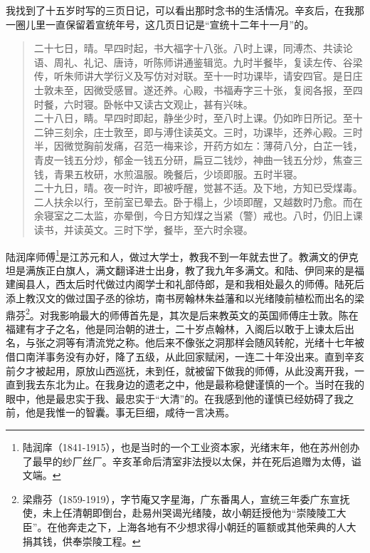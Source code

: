 我找到了十五岁时写的三页日记，可以看出那时念书的生活情况。辛亥后，在我那一圈儿里一直保留着宣统年号，这几页日记是“宣统十二年十一月”的。\\

\begin{quote}
	二十七日，晴。早四时起，书大福字十八张。八时上课，同溥杰、共读论语、周礼、礼记、唐诗，听陈师讲通鉴辑览。九时半餐毕，复读左传、谷梁传，听朱师讲大学衍义及写仿对对联。至十一时功课毕，请安四官。是日庄士敦未至，因微受感冒。遂还养。心殿，书福寿字三十张，复阅各报，至四时餐，六时寝。卧帐中又读古文观止，甚有兴味。\\

二十八日，睛。早四时即起，静坐少时，至八时上课。仍如昨日所记。至十二钟三刻余，庄士敦至，即与溥住读英文。三时，功课毕，还养心殿。三时半，因微觉胸前发痛，召范一梅来诊，开药方如左：薄荷八分，白芷一钱，青皮一钱五分炒，郁金一钱五分研，扁豆二钱炒，神曲一钱五分炒，焦查三钱，青果五枚研，水煎温服。晚餐后，少顷即服。五时半寝。\\

二十九日，晴。夜一时许，即被呼醒，觉甚不适。及下地，方知已受煤毒。二人扶余以行，至前室已晕去。卧于榻上，少顷即醒，又越数时乃愈。而在余寝室之二太监，亦晕倒，今日方知煤之当紧（警）戒也。八时，仍旧上课读书，并读英文。三时下学，餐毕，至六时余寝。\\
\end{quote}

陆润庠师傅\footnote{陆润庠（1841-1915），也是当时的一个工业资本家，光绪末年，他在苏州创办了最早的纱厂丝厂。辛亥革命后清室非法授以太保，并在死后追赠为太傅，谥文端。}是江苏元和人，做过大学士，教我不到一年就去世了。教满文的伊克坦是满族正白旗人，满文翻译进士出身，教了我九年多满文。和陆、伊同来的是福建闽县人，西太后时代做过内阁学士和礼部侍郎，是和我相处最久的师傅。陆死后添上教汉文的做过国子丞的徐坊，南书房翰林朱益藩和以光绪陵前植松而出名的梁鼎芬\footnote{梁鼎芬（1859-1919），字节庵又字星海，广东番禺人，宣统三年委广东宣抚使，未上任清朝即倒台，赴易州哭谒光绪陵，故小朝廷授他为“崇陵陵工大臣”。在他奔走之下，上海各地有不少想求得小朝廷的匾额或其他荣典的人大捐其钱，供奉崇陵工程。}。对我影响最大的师傅首先是，其次是后来教英文的英国师傅庄士敦。陈在福建有才子之名，他是同治朝的进士，二十岁点翰林，入阁后以敢于上谏太后出名，与张之洞等有清流党之称。他后来不像张之洞那样会随风转舵，光绪十七年被借口南洋事务没有办好，降了五级，从此回家赋闲，一连二十年没出来。直到辛亥前夕才被起用，原放山西巡抚，未到任，就被留下做我的师傅，从此没离开我，一直到我去东北为止。在我身边的遗老之中，他是最称稳健谨慎的一个。当时在我的眼中，他是最忠实于我、最忠实于“大清”的。在我感到他的谨慎已经妨碍了我之前，他是我惟一的智囊。事无巨细，咸待一言决焉。\\


